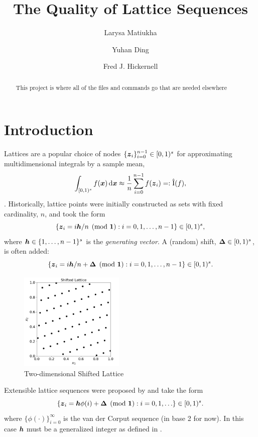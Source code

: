 \documentclass{amsart}
\DeclareMathOperator{\appxint}{\hat{I}}
\begin{document}
\title{The Quality of Lattice Sequences}
\author{Larysa Matiukha}
\author{Yuhan Ding}
\author{Fred J. Hickernell}
\begin{abstract}This project is where all of the files and commands go that are needed elsewhere
\end{abstract}

\maketitle

\section{Introduction}
Lattices are a popular choice of nodes $\{\boldsymbol{z}_i\}_{i=0}^{n-1} \in [0,1)^s$ for approximating multidimensional integrals by a sample mean,
\[
\int_{[0,1)^s} f(\vx) \, \dif \vx \approx \frac{1}{n} \sum_{i=0}^{n-1} f(\vz_i) =:\appxint(f),
\]
\cite{DicEtal22a,Nie92,SloJoe94}.
Historically, lattice points were initially constructed as sets with fixed cardinality, $n$, and took the form
\begin{equation} \label{eq:lat}
    \{\boldsymbol{z}_i = i \boldsymbol{h}/n \pmod{\boldsymbol{1}} : i=0,1, \ldots, n-1 \} \in [0,1)^s,
\end{equation}
where $\boldsymbol{h} \in \{1, \ldots, n-1\}^s$ is the \emph{generating vector}.  A (random) shift, $\boldsymbol{\Delta} \in [0,1)^s$, is often added:
\begin{equation} \label{eq:shlat}
    \{\boldsymbol{z}_i = i \boldsymbol{h}/n + \boldsymbol{\Delta} \pmod{\boldsymbol{1}} : i=0,1, \ldots, n-1 \} \in [0,1)^s.
\end{equation}

\begin{figure}[h]
\includegraphics[width=5cm,trim={0 0 0 7.5mm},clip]{shifted-lattice}
\caption{Two-dimensional Shifted Lattice}
\label{fig:enter-label}
\end{figure}



Extensible lattice sequences were proposed by \cite{HicEtal00,Mai81a} and take the form
\begin{equation} \label{eq:extlat}
    \{\boldsymbol{z}_i = \boldsymbol{h}\phi(i)+ \boldsymbol{\Delta} \pmod{\boldsymbol{1}} : i=0,1, \ldots \} \in [0,1)^s.
\end{equation}
where $\{\phi(\cdot)\}_{i=0}^\infty$ is the van der Corput sequence (in base 2 for now).  In this case $\boldsymbol{h}$ must be a generalized integer as defined in \cite[Section 2]{HicNie03a}.
\end{document}
